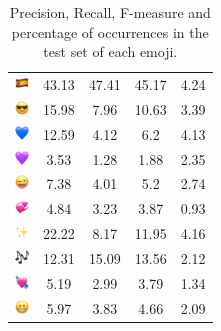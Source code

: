 \documentclass{article}
\begin{document}
\begin{table}
\begin{tabular}{|c|ccc|c|}
\includegraphics[height=0.37cm,width=0.37cm]{img/Spain.png} & 43.13 & 47.41 & 45.17 & 4.24\\ 
\includegraphics[height=0.37cm,width=0.37cm]{img/smiling_face_with_sunglasses.png} & 15.98 & 7.96 & 10.63 & 3.39\\ 
\includegraphics[height=0.37cm,width=0.37cm]{img/blue_heart.png} & 12.59 & 4.12 & 6.2 & 4.13\\ 
\includegraphics[height=0.37cm,width=0.37cm]{img/purple_heart.png} & 3.53 & 1.28 & 1.88 & 2.35\\ 
\includegraphics[height=0.37cm,width=0.37cm]{img/winking_face_with_tongue.png} & 7.38 & 4.01 & 5.2 & 2.74\\ 
\includegraphics[height=0.37cm,width=0.37cm]{img/revolving_hearts.png} & 4.84 & 3.23 & 3.87 & 0.93\\ 
\includegraphics[height=0.37cm,width=0.37cm]{img/sparkles.png} & 22.22 & 8.17 & 11.95 & 4.16\\ 
\includegraphics[height=0.37cm,width=0.37cm]{img/musical_notes.png} & 12.31 & 15.09 & 13.56 & 2.12\\ 
\includegraphics[height=0.37cm,width=0.37cm]{img/heart_with_arrow.png} & 5.19 & 2.99 & 3.79 & 1.34\\ 
\includegraphics[height=0.37cm,width=0.37cm]{img/beaming_face_with_smiling_eyes.png} & 5.97 & 3.83 & 4.66 & 2.09\\ 

\hline
\end{tabular}
\caption{\label{table:emoji_detailed} Precision, Recall, F-measure and percentage of occurrences in the test set of each emoji.}
\end{table}
\end{document}
